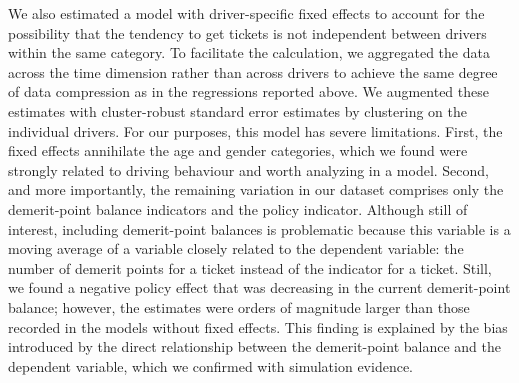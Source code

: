 We also estimated a model with driver-specific fixed effects
to account for the possibility that the tendency to get tickets
is not independent between drivers within the same category. 
To facilitate the calculation, we aggregated the data across the time dimension
rather than across drivers
to achieve the same degree of data compression as in the regressions reported above.
We augmented these estimates with cluster-robust standard error estimates 
by clustering on the individual drivers. 
For our purposes, this model has severe limitations. 
First, the fixed effects annihilate the age and gender categories, 
which we found were strongly related to driving behaviour
and worth analyzing in a model. 
Second, and more importantly, 
the remaining variation in our dataset comprises 
only the demerit-point balance indicators and the policy indicator. 
Although still of interest, including demerit-point balances is problematic because 
this variable is a moving average of a variable closely related to the dependent variable:
the number of demerit points for a ticket instead of the indicator for a ticket. 
Still, we found a negative policy effect that was decreasing 
in the current demerit-point balance;
however, the estimates were orders of magnitude larger 
than those recorded in the models without fixed effects. 
This finding is explained by the bias introduced by the direct relationship between the demerit-point balance and the dependent variable, 
which we confirmed with simulation evidence. 


